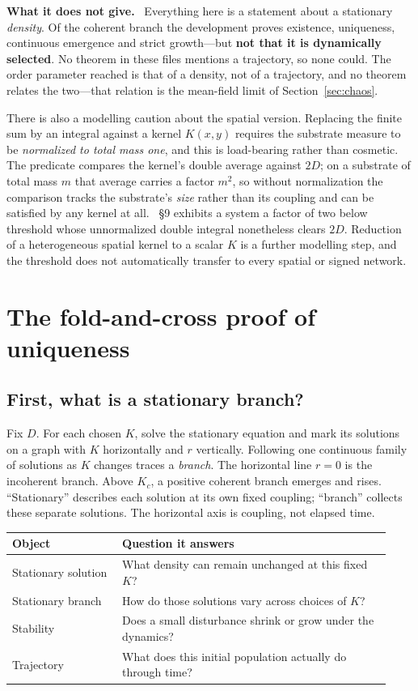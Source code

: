 \documentclass[11pt]{article}
\newcommand{\scope}{\par\smallskip\noindent\textbf{What it does not give.}\ }
\newcommand{\id}[1]{{\small\ttfamily\seqsplit{#1}}}
\begin{document}
\scope
Everything here is a statement about a stationary \emph{density}. Of the
coherent branch the development proves existence, uniqueness, continuous
emergence and strict growth---but \textbf{not that it is dynamically
selected}. No theorem in these files mentions a trajectory, so none could.
The order parameter reached is that of a density, not of a trajectory, and no
theorem relates the two---that relation is the mean-field limit of
Section~\ref{sec:chaos}.

There is also a modelling caution about the spatial version. Replacing the
finite sum by an integral against a kernel $K(x,y)$ requires the substrate
measure to be \emph{normalized to total mass one}, and this is load-bearing
rather than cosmetic. The predicate compares the kernel's double average
against $2D$; on a substrate of total mass $m$ that average carries a factor
$m^2$, so without normalization the comparison tracks the substrate's
\emph{size} rather than its coupling and can be satisfied by any kernel at all.
\id{Examples}~\S9 exhibits a system a factor of two below threshold whose
unnormalized double integral nonetheless clears $2D$. Reduction of a
heterogeneous spatial kernel to a scalar $K$ is a further modelling step, and
the threshold does not automatically transfer to every spatial or signed
network.

\section{The fold-and-cross proof of uniqueness}
\label{sec:fold}

\subsection{First, what is a stationary branch?}

Fix $D$. For each chosen $K$, solve the stationary equation and mark its
solutions on a graph with $K$ horizontally and $r$ vertically. Following one
continuous family of solutions as $K$ changes traces a \emph{branch}. The
horizontal line $r=0$ is the incoherent branch. Above $K_c$, a positive
coherent branch emerges and rises. ``Stationary'' describes each solution
at its own fixed coupling; ``branch'' collects these separate solutions.
The horizontal axis is coupling, not elapsed time.

\begin{center}
\begin{tabular}{@{}p{0.27\linewidth}p{0.66\linewidth}@{}}
\hline
Object & Question it answers \\
\hline
Stationary solution & What density can remain unchanged at this fixed $K$? \\
Stationary branch & How do those solutions vary across choices of $K$? \\
Stability & Does a small disturbance shrink or grow under the dynamics? \\
Trajectory & What does this initial population actually do through time? \\
\hline
\end{tabular}
\end{center}
\end{document}
